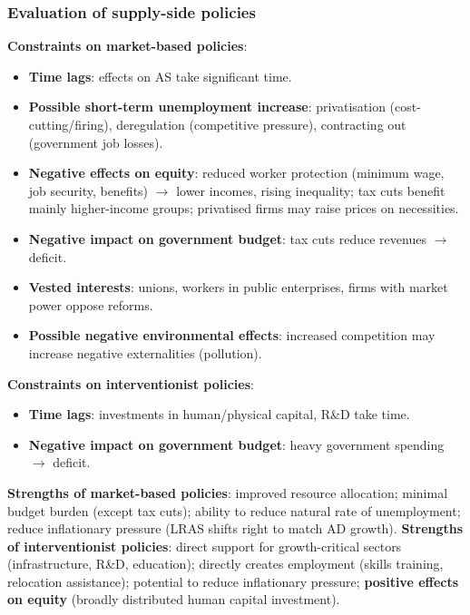 \subsubsection*{Evaluation of supply-side policies}
\textbf{Constraints on market-based policies}:
\begin{itemize}
  \item \textbf{Time lags}: effects on AS take significant time.
  \item \textbf{Possible short-term unemployment increase}: privatisation (cost-cutting/firing), deregulation (competitive pressure), contracting out (government job losses).
  \item \textbf{Negative effects on equity}: reduced worker protection (minimum wage, job security, benefits) $\to$ lower incomes, rising inequality; tax cuts benefit mainly higher-income groups; privatised firms may raise prices on necessities.
  \item \textbf{Negative impact on government budget}: tax cuts reduce revenues $\to$ deficit.
  \item \textbf{Vested interests}: unions, workers in public enterprises, firms with market power oppose reforms.
  \item \textbf{Possible negative environmental effects}: increased competition may increase negative externalities (pollution).
\end{itemize}
\textbf{Constraints on interventionist policies}:
\begin{itemize}
  \item \textbf{Time lags}: investments in human/physical capital, R\&D take time.
  \item \textbf{Negative impact on government budget}: heavy government spending $\to$ deficit.
\end{itemize}
\textbf{Strengths of market-based policies}: improved resource allocation; minimal budget burden (except tax cuts); ability to reduce natural rate of unemployment; reduce inflationary pressure (LRAS shifts right to match AD growth).
\textbf{Strengths of interventionist policies}: direct support for growth-critical sectors (infrastructure, R\&D, education); directly creates employment (skills training, relocation assistance); potential to reduce inflationary pressure; \textbf{positive effects on equity} (broadly distributed human capital investment).

